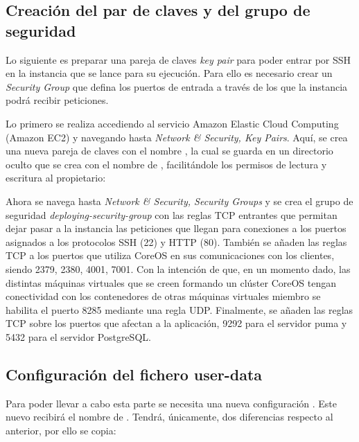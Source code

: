 \subsection{Creación del par de claves y del grupo de seguridad}

Lo siguiente es preparar una pareja de claves \textit{key pair} para poder entrar por SSH en la instancia que se lance para su ejecución. Para ello es necesario crear un \textit{Security Group} que defina los puertos de entrada a través de los que la instancia podrá recibir peticiones.

Lo primero se realiza accediendo al servicio Amazon Elastic Cloud Computing (Amazon EC2) y navegando hasta \textit{Network \& Security, Key Pairs}. Aquí, se crea una nueva pareja de claves con el nombre , la cual se guarda en un directorio oculto que se crea con el nombre de , facilitándole los permisos de lectura y escritura al propietario:


Ahora se navega hasta \textit{Network \& Security, Security Groups} y se crea el grupo de seguridad \textit{deploying-security-group} con las reglas TCP entrantes que permitan dejar pasar a la instancia las peticiones que llegan para conexiones a los puertos asignados a los protocolos SSH (22) y HTTP (80). También se añaden las reglas TCP a los puertos que utiliza CoreOS en sus comunicaciones con los clientes, siendo 2379, 2380, 4001, 7001. Con la intención de que, en un momento dado, las distintas máquinas virtuales que se creen formando un clúster CoreOS tengan conectividad con los contenedores de otras máquinas virtuales miembro se habilita el puerto 8285 mediante una regla UDP. Finalmente, se añaden las reglas TCP sobre los puertos que afectan a la aplicación, 9292 para el servidor puma y 5432 para el servidor PostgreSQL.

\subsection{Configuración del fichero user-data}

Para poder llevar a cabo esta parte se necesita una nueva configuración . Este nuevo  recibirá el nombre de . Tendrá, únicamente, dos diferencias respecto al anterior, por ello se copia:

